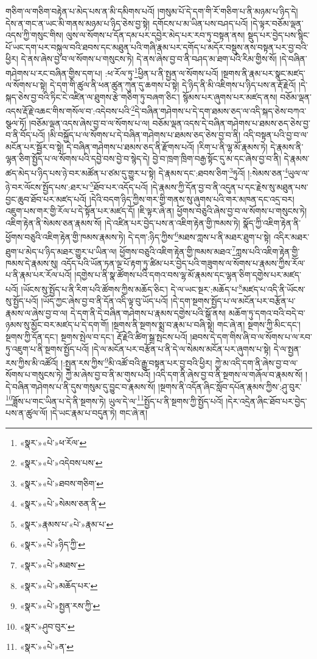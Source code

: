 གཅིག་ལ་གཅིག་བརྟེན་པ་མེད་པས་ན་མི་དམིགས་པའོ། །གསུམ་པོ་དེ་དག་གི་རོ་གཅིག་པ་ནི་མཉམ་པ་ཉིད་དེ། དེས་ན་གང་ན་ཡང་མི་གནས་མཉམ་པ་ཉིད་ཅེས་བྱ་སྟེ། དགོངས་པ་མ་ཡིན་པས་བཤད་པའོ། །དེ་ལྟར་བཅོམ་ལྡན་འདས་ཀྱི་གསུང་གིས། ལུས་ལ་སོགས་པ་དོན་དམ་པར་དབྱེར་མེད་པར་རབ་ཏུ་བསྟན་ནས། སྡུད་པར་བྱེད་པས་སྙིང་པོ་ཡང་དག་པར་བསྐུལ་བའི་ཐབས་དང་མཐུན་པའི་གཞི་རྣམ་པར་དགོད་པ་མདོར་བསྡུས་ནས་བསྟན་པར་བྱ་བའི་ཕྱིར། དེ་ནས་ཞེས་བྱ་བ་ལ་སོགས་པ་གསུངས་ཏེ། དེ་ནས་ཞེས་བྱ་བ་ནི་བཤད་མ་ཐག་པའི་རིམ་གྱིས་སོ། །དེ་བཞིན་གཤེགས་པ་རང་བཞིན་གྱིས་དག་པ། :ཕ་རོལ་ཏུ་\footnote{«སྣར་»«པེ་»ཕ་རོལ་}ཕྱིན་པ་ནི་སྤྱན་ལ་སོགས་པའོ། །སྔགས་ནི་རྣམ་པར་སྣང་མཛད་ལ་སོགས་པ་སྟེ། དེ་དག་གི་ཚུལ་ནི་ཕན་ཚུན་ཀུན་དུ་ཆགས་པ་སྟེ། དེ་ཉིད་ནི་མི་འཇིགས་པ་ཉིད་པས་ན་རྡོ་རྗེའོ། །དེ་སྐད་ཅེས་བྱ་བའི་ཏིང་ངེ་འཛིན་ལ་ཐུགས་རྩེ་གཅིག་ཏུ་བཞག་ཅིང་། སྙོམས་པར་ཞུགས་པར་མཛད་ནས། བཅོམ་ལྡན་འདས་རྡོ་རྗེ་འཆང་གིས་གསོལ་བ་:འདེབས་པའི་\footnote{«སྣར་»«པེ་»འདེབས་པས་}དེ་བཞིན་གཤེགས་པ་དེ་དག་ཐམས་ཅད་ལ་འདི་སྐད་ཅེས་བཀའ་སྩལ་ཏོ། །བཅོམ་ལྡན་འདས་ཞེས་བྱ་བ་ལ་སོགས་པ་ལ། བཅོམ་ལྡན་འདས་དེ་བཞིན་གཤེགས་པ་ཐམས་ཅད་ཅེས་བྱ་བ་ནི་བོད་པའོ། །མི་བསྐྱོད་པ་ལ་སོགས་པ་དེ་བཞིན་གཤེགས་པ་ཐམས་ཅད་ཅེས་བྱ་བ་ནི། འདི་བསྟན་པའི་བྱ་བ་ལ་མངོན་པར་སྦྱོར་བ་སྟེ། དེ་བཞིན་གཤེགས་པ་ཐམས་ཅད་ནི་རྫོགས་པའོ། །རིག་པ་ནི་ལྷ་མོ་རྣམས་ཏེ། དེ་རྣམས་ནི་ལྷན་ཅིག་སྤྱོད་པ་ལ་སོགས་པའི་དབྱེ་བས་བྱེ་བ་སྙེད་དེ། བྱེ་བ་ཁྲག་ཁྲིག་བརྒྱ་སྟོང་དུ་མ་དང་ཞེས་བྱ་བ་ནི། དེ་རྣམས་ཚད་མེད་པ་ཉིད་པས་ཉེ་བར་མཚོན་པ་ཙམ་དུ་གྱུར་པ་སྟེ། དེ་རྣམས་དང་:ཐབས་ཅིག་\footnote{«སྣར་»«པེ་»ཐབས་གཅིག་}ཏུའོ། །:སེམས་ཅན་\footnote{«སྣར་»«པེ་»སེམས་ཅན་ནི་}ཡུལ་ལ་ཉེ་བར་ལོངས་སྤྱོད་པས་:ཐར་པ་\footnote{«སྣར་»རྣམས་པ་«པེ་»རྣམ་པ་}ཐོབ་པར་འདོད་པའོ། །དེ་རྣམས་ཀྱི་དོན་བྱ་བ་ནི་འདུན་པ་དང་རྗེས་སུ་མཐུན་པས་བྱང་ཆུབ་ཐོབ་པར་མཛད་པའོ། །དེའི་བདག་ཉིད་ཀྱིས་གར་གྱི་གནས་སུ་ཞུགས་པའི་གར་མཁན་དང་འདྲ་བར། འཇུག་པས་གར་གྱི་རོལ་པ་དེ་སྟོན་པར་མཛད་དོ། །ཇི་ལྟར་ཞེ་ན། ཕྱོགས་བཅུའི་ཞེས་བྱ་བ་ལ་སོགས་པ་གསུངས་ཏེ། འཇིག་རྟེན་ནི་སེམས་ཅན་རྣམས་སོ། །དེ་འཛིན་པར་བྱེད་པས་ན་འཇིག་རྟེན་གྱི་ཁམས་ཏེ། སྣོད་ཀྱི་འཇིག་རྟེན་ནི་ཕྱོགས་བཅུའི་འཇིག་རྟེན་གྱི་ཁམས་རྣམས་ཏེ། དེ་དག་:ཉིད་ཀྱིས་\footnote{«སྣར་»«པེ་»ཉིད་ཀྱི་}མཐས་ཀླས་པ་ནི་མཐར་ཐུག་པ་སྟེ། འདིར་མཐར་ཐུག་པ་མེད་པ་ཉིད་མཐར་གྱུར་པ་ཡིན་ལ། ཕྱོགས་བཅུའི་འཇིག་རྟེན་གྱི་ཁམས་མཐའ་\footnote{«སྣར་»«པེ་»མཐས་}ཀླས་པའི་འཇིག་རྟེན་གྱི་ཁམས་དེ་རྣམས་སུ། འདོད་པའི་ཡོན་ཏན་ལྔ་པོ་རྟག་ཏུ་ཚིམ་པར་བྱེད་པའི་གཟུགས་ལ་སོགས་པ་རྣམས་ཀྱིས་རོལ་པ་ནི་རྣམ་པར་རོལ་པའོ། །དགྱེས་པ་ནི་སྣ་ཚོགས་པའི་དགའ་བས་ལྷ་མོ་རྣམས་དང་ལྷན་ཅིག་དགྱེས་པར་མཛད་པའོ། །ཡོངས་སུ་སྤྱོད་པ་ནི་རིག་པའི་ཚོགས་ཀྱིས་མཆོད་ཅིང་། དེ་ལ་ཡང་སྔར་:མཆོད་པ་\footnote{«སྣར་»«པེ་»མཆོད་པར་}མཛད་པ་འདི་ནི་ཡོངས་སུ་སྤྱོད་པའོ། །ཡོད་ཀྱང་ཞེས་བྱ་བ་ནི་དོན་འདི་ལྟ་བུ་ཡོད་པའོ། །དེ་དག་སྔགས་སྤྱོད་པ་ལ་མངོན་པར་བརྩོན་པ་རྣམས་ལ་ཞེས་བྱ་བ་ལ། དེ་དག་ནི་དེ་བཞིན་གཤེགས་པ་རྣམས་དགྱེས་པའི་སྒོ་ནས། མཆོག་ཏུ་དགའ་བའི་བདེ་བ་ཉམས་སུ་མྱོང་བར་མཛད་པ་དེ་དག་གོ། །སྔགས་ནི་སྔགས་སྨྲ་བ་རྣམ་པ་བཞི་སྟེ། གང་ཞེ་ན། སྔགས་ཀྱི་མིང་དང་། སྔགས་ཀྱི་དོན་དང་། སྔགས་སྤེལ་བ་དང་། རྡོ་རྗེའི་ཚིག་སྒྲ་སྤངས་པའོ། །ཐབས་དེ་དག་གིས་ཞི་བ་ལ་སོགས་པ་ལ་རབ་ཏུ་འཇུག་པ་ནི་སྔགས་སྤྱོད་པའོ། །དེ་ལ་མངོན་པར་བརྩོན་པ་ནི་དེ་ལ་སེམས་མངོན་པར་ཞུགས་པ་སྟེ། དེ་ལ་སྤྱན་རས་ཀྱིས་མི་འཚོའོ། །:སྤྱན་རས་ཀྱིས་\footnote{«སྣར་»«པེ་»སྤྱན་རས་ཀྱི་}མི་འཚོ་བའི་རྒྱུ་བསྟན་པར་བྱ་བའི་ཕྱིར། ཀྱེ་མ་འདི་དག་ནི་ཞེས་བྱ་བ་ལ་སོགས་པ་གསུངས་ཏེ། ཀྱེ་མ་ཞེས་བྱ་བ་ནི་མ་གུས་པའོ། །འདི་དག་ནི་ཞེས་བྱ་བ་ནི་སྔགས་ལ་གཞོལ་བ་རྣམས་སོ། །དེ་བཞིན་གཤེགས་པ་ནི་དུས་གསུམ་དུ་བྱུང་བ་རྣམས་སོ། །སྔགས་ནི་འདོན་ཞིང་སློབ་དཔོན་རྣམས་ཀྱིས་:ཤུ་བུར་\footnote{«སྣར་»ཤུབ་བུར་}ཟློས་པ་གང་ཡིན་པ་དེ་ནི་སྔགས་ཏེ། ཡུལ་དེ་ལ་\footnote{«སྣར་»«པེ་»ན་}སྤྱོད་པ་ནི་སྔགས་ཀྱི་སྤྱོད་པའོ། །དེར་འདྲེན་ཞིང་ཐོབ་པར་བྱེད་པས་ན་ཚུལ་ལོ། །དེ་ཡང་རྣམ་པ་བདུན་ཏེ། གང་ཞེ་ན། 